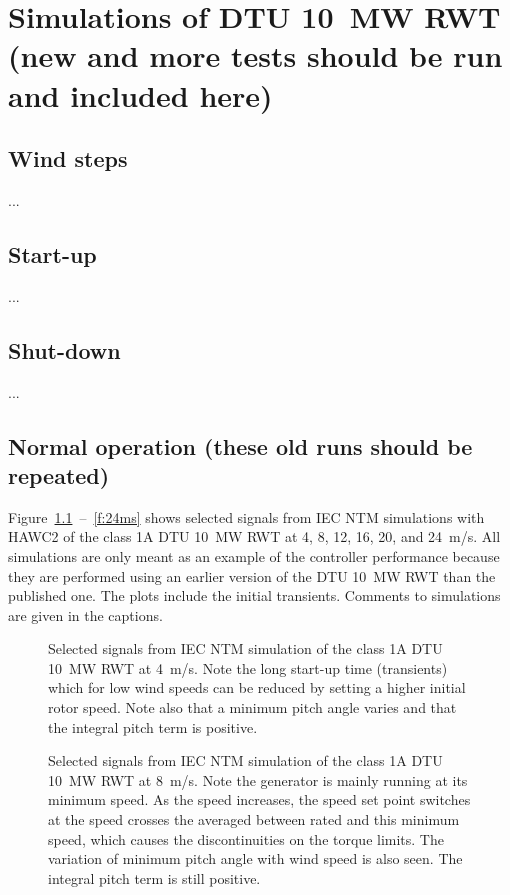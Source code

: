 \chapter{Simulations of DTU 10~MW RWT (new and more tests should be run and included here)}

\section{Wind steps}

...

\section{Start-up}


...


\section{Shut-down}

...

\section{Normal operation (these old runs should be repeated)}


Figure~\ref{f:4ms}~--~\ref{f:24ms} shows selected signals from IEC NTM simulations with HAWC2 of the class 1A DTU 10~MW RWT at 4, 8, 12, 16, 20, and 24~m/s. All simulations are only meant as an example of the controller performance because they are performed using an earlier version of the DTU 10~MW RWT than the published one. The plots include the initial transients. Comments to simulations are given in the captions.


\begin{figure}[t]
\centerline{ }
\caption{Selected signals from IEC NTM simulation of the class 1A DTU 10~MW RWT at 4~m/s. Note the long start-up time (transients) which for low wind speeds can be reduced by setting a higher initial rotor speed. Note also that a minimum pitch angle varies and that the integral pitch term is positive. \label{f:4ms}}
\end{figure}


\begin{figure}[t]
\centerline{ }
\caption{Selected signals from IEC NTM simulation of the class 1A DTU 10~MW RWT at 8~m/s. Note the generator is mainly running at its minimum speed. As the speed increases, the speed set point switches at the speed crosses the averaged between rated and this minimum speed, which causes the discontinuities on the torque limits. The variation of minimum pitch angle with wind speed is also seen. The integral pitch term is still positive. \label{f:8ms}}
\end{figure}



